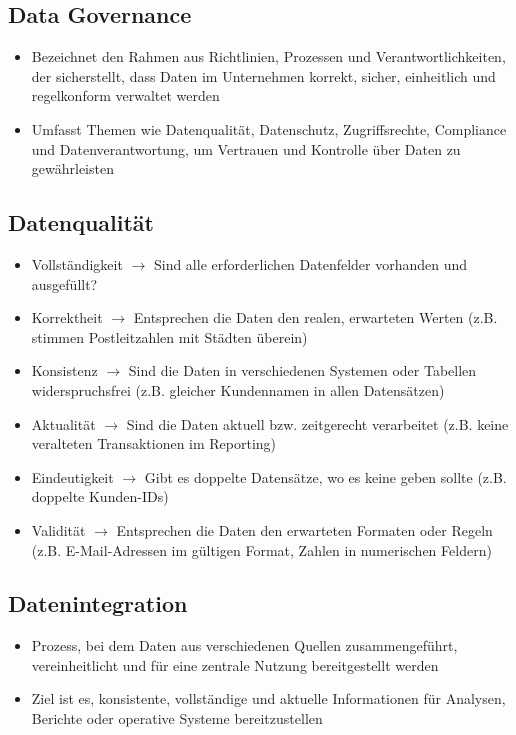 \documentclass[11pt]{scrartcl}
\begin{document}
\subsection{Data Governance}
\begin{itemize}
\item Bezeichnet den Rahmen aus Richtlinien, Prozessen und Verantwortlichkeiten, der sicherstellt, dass Daten im Unternehmen korrekt, sicher, einheitlich und regelkonform verwaltet werden
\item Umfasst Themen wie Datenqualität, Datenschutz, Zugriffsrechte, Compliance und Datenverantwortung, um Vertrauen und Kontrolle über Daten zu gewährleisten
\end{itemize}


\subsection{Datenqualität}
\begin{itemize}
\item Vollständigkeit $ \to $ Sind alle erforderlichen Datenfelder vorhanden und ausgefüllt?
\item Korrektheit $ \to $ Entsprechen die Daten den realen, erwarteten Werten (z.B. stimmen Postleitzahlen mit Städten überein)
\item Konsistenz $ \to $ Sind die Daten in verschiedenen Systemen oder Tabellen widerspruchsfrei (z.B. gleicher Kundennamen in allen Datensätzen)
\item Aktualität $ \to $ Sind die Daten aktuell bzw. zeitgerecht verarbeitet (z.B. keine veralteten Transaktionen im Reporting)
\item Eindeutigkeit $ \to $ Gibt es doppelte Datensätze, wo es keine geben sollte (z.B. doppelte Kunden-IDs)
\item Validität $ \to $ Entsprechen die Daten den erwarteten Formaten oder Regeln (z.B. E-Mail-Adressen im gültigen Format, Zahlen in numerischen Feldern)
\end{itemize}


\subsection{Datenintegration}
\begin{itemize}
	\item Prozess, bei dem Daten aus verschiedenen Quellen zusammengeführt, vereinheitlicht und für eine zentrale Nutzung bereitgestellt werden
	\item Ziel ist es, konsistente, vollständige und aktuelle Informationen für Analysen, Berichte oder operative Systeme bereitzustellen
\end{itemize}
\end{document}
